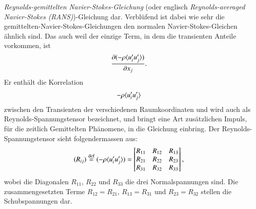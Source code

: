 \emph{Reynolds-gemittelten Navier-Stokes-Gleichung} (oder englisch \emph{Reynolds-averaged
Navier-Stokes (RANS)})-Gleichung dar.
Verblüfend ist dabei wie sehr die gemittelten-Navier-Stokes-Gleichungen den normalen Navier-Stokes-Gleichen ähnlich sind.
Das auch weil der einzige Term, in dem die transienten
Anteile vorkommen, ist
%
\begin{equation*}
    \frac{\partial(- \rho \ravg{u_i' u_j'})}{\partial x_j}.
\end{equation*}
%
Er enthält die Korrelation
%
\[
- \rho \ravg{u_i' u_j'}
\]
%
zwischen den Transienten der verschiedenen Raumkoordinaten und wird auch als Reynolds-Spannungstensor
bezeichnet, und bringt eine Art zusätzlichen Impuls, für die zeitlich Gemittelten Phänomene, in die Gleichung einbring.
Der Reynolds-Spannungstensor sieht folgendermassen aus:
%
\begin{equation*}
    (R_{ij}) \overset{\text{def}}{=} (-\rho\ravg{u'_i u'_j}) =
        \begin{bmatrix}
            R_{11} & R_{12} & R_{13} \\
            R_{21} & R_{22} & R_{23} \\
            R_{31} & R_{32} & R_{33}
        \end{bmatrix},
\end{equation*}
%
wobei die Diagonalen $R_{11}$, $R_{22}$ und $R_{33}$ die drei Normalspannungen sind.
Die zusammengesetzten Terme $R_{12} = R_{21}$, $R_{13} = R_{31}$ und $R_{23} = R_{32}$ stellen
die Schubspannungen dar.
%
